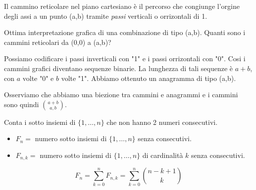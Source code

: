\begin{center}
\end{center}

Il cammino reticolare nel piano cartesiano è il percorso che congiunge l'orgine degli assi a un punto (a,b) tramite \textit{passi} verticali o orrizontali di 1.

Ottima interpretazione grafica di una combinazione di tipo (a,b).
Quanti sono i cammini reticolari da (0,0) a (a,b)?

Possiamo codificare i passi inverticali con "1" e i passi orrizontali con "0". Cosi i cammini grafici diventano sequenze binarie. La lunghezza di tali sequenze è $a+b$, con $a$ volte "0" e $b$ volte "1". Abbiamo ottenuto un anagramma di tipo (a,b).

Osserviamo che abbiamo una biezione tra cammini e anagrammi e i cammini sono quindi $\binom{a+b}{a,b}$.

Conta i sotto insiemi di $\{1,\dots,n\}$ che non hanno 2 numeri consecutivi.

\begin{itemize}
	\item $F_n=$ numero sotto insiemi di $\{1,\dots,n\}$ senza consecutivi.
	\item $F_{n,k}=$ numero sotto insiemi di $\{1,\dots,n\}$ di cardinalità $k$ senza consecutivi.
\end{itemize}

\[F_n=\sum_{k=0}^nF_{n, k}=\sum_{k=0}^n\binom{n-k+1}{k}\]

